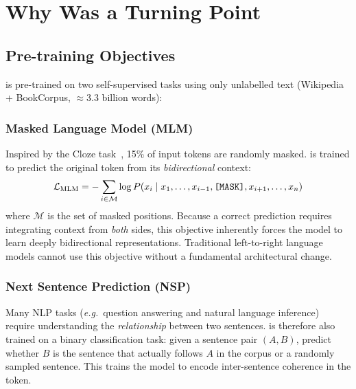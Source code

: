 \section{Why \bert{} Was a Turning Point}
\label{sec:turning_point}

\subsection{Pre-training Objectives}

\bert{} is pre-trained on two self-supervised tasks using only unlabelled text
(Wikipedia + BookCorpus, $\approx$3.3 billion words):

\subsubsection{Masked Language Model (MLM)}

Inspired by the Cloze task~\cite{taylor1953cloze}, 15\% of input tokens are
randomly masked. \bert{} is trained to predict the original token from its
\emph{bidirectional} context:
\begin{equation}
  \mathcal{L}_{\text{MLM}}
    = -\sum_{i \in \mathcal{M}}
      \log P\!\left(x_i \mid x_1, \ldots, x_{i-1},
      \texttt{[MASK]}{}, x_{i+1}, \ldots, x_n\right)
  \label{eq:mlm}
\end{equation}
where $\mathcal{M}$ is the set of masked positions. Because a correct prediction
requires integrating context from \emph{both} sides, this objective inherently
forces the model to learn deeply bidirectional representations. Traditional
left-to-right language models cannot use this objective without a fundamental
architectural change.

\subsubsection{Next Sentence Prediction (NSP)}

Many NLP tasks (\textit{e.g.}\ question answering and natural language
inference) require understanding the \emph{relationship} between two sentences.
\bert{} is therefore also trained on a binary classification task: given a
sentence pair $(A, B)$, predict whether $B$ is the sentence that actually
follows $A$ in the corpus or a randomly sampled sentence. This trains the model
to encode inter-sentence coherence in the \cls{} token.

